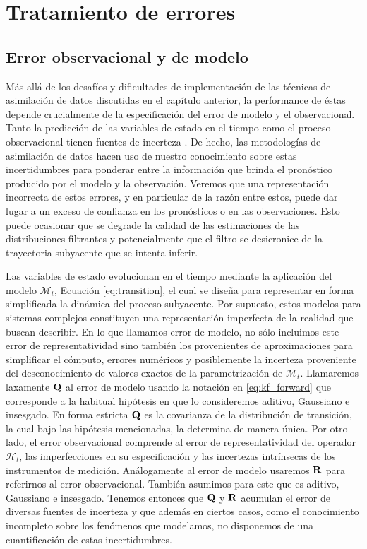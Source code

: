 \chapter{Tratamiento de errores} \label{chp:error_treatment}

\section{Error observacional y de modelo} \label{sec:model_obs_error}

Más allá de los desafíos y dificultades de implementación de las técnicas de asimilación de datos discutidas en el capítulo anterior, la performance de éstas depende crucialmente de la especificación del error de modelo y el observacional. Tanto la predicción de las variables de estado en el tiempo como el proceso observacional tienen fuentes de incerteza \citep{Tandeo2020,Dee1995,Dee1999}. De hecho, las metodologías de asimilación de datos hacen uso de nuestro conocimiento sobre estas incertidumbres para ponderar entre la información que brinda el pronóstico producido por el modelo y la observación. Veremos que una representación incorrecta de estos errores, y en particular de la razón entre estos, puede dar lugar a un exceso de confianza en los pronósticos o en las observaciones. Esto puede ocasionar que se degrade la calidad de las estimaciones de las distribuciones filtrantes y potencialmente que el filtro se desicronice de la trayectoria subyacente que se intenta inferir.

Las variables de estado evolucionan en el tiempo mediante la aplicación del modelo $\mathcal{M}_t$, Ecuación \ref{eq:transition}, el cual se diseña para representar en forma simplificada la dinámica del proceso subyacente. Por supuesto, estos modelos para sistemas complejos constituyen una representación imperfecta de la realidad que buscan describir. En lo que llamamos error de modelo, no sólo incluimos este error de representatividad sino también los provenientes de aproximaciones para simplificar el cómputo, errores numéricos y posiblemente la incerteza proveniente del desconocimiento de valores exactos de la parametrización de $\mathcal{M}_t$. Llamaremos laxamente $\mathbf{Q}$ al error de modelo usando la notación en \ref{eq:kf_forward} que corresponde a la habitual hipótesis en que lo consideremos aditivo, Gaussiano e insesgado. En forma estricta $\mathbf{Q}$ es la covarianza de la distribución de transición, la cual bajo las hipótesis mencionadas, la determina de manera única. Por otro lado, el error observacional comprende al error de representatividad del operador $\mathcal{H}_t$, las imperfecciones en su especificación y las incertezas intrínsecas de los instrumentos de medición. Análogamente al error de modelo usaremos $\mathbf{R}$ para referirnos al error observacional. También asumimos para este que es aditivo, Gaussiano e insesgado. Tenemos entonces que $\mathbf{Q}$ y $\mathbf{R}$ acumulan el error de diversas fuentes de incerteza y que además en ciertos casos, como el conocimiento incompleto sobre los fenómenos que modelamos, no disponemos de una cuantificación de estas incertidumbres.

